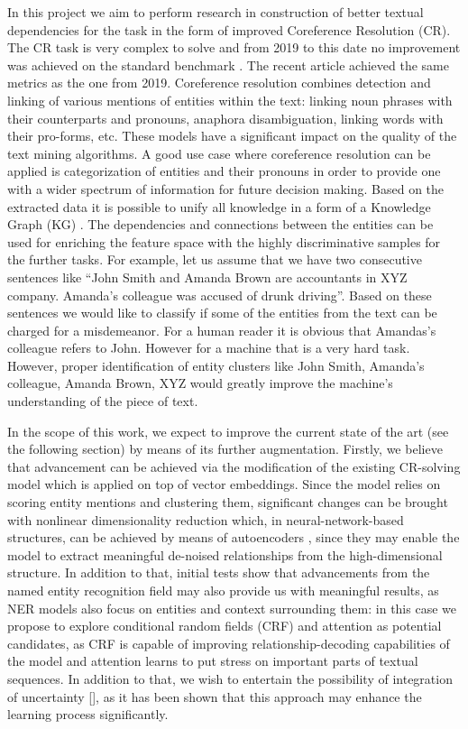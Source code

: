 In this project we aim to perform research in construction of better textual dependencies for the task in the form of improved Coreference Resolution (CR). The CR task is very complex to solve and from 2019 to this date \cite{spanbert-Joshi2020} no improvement was achieved on the standard benchmark \cite{ontonotes5-Weischedel2013}. The recent article \cite{cr-Toshniwal2020} achieved the same metrics as the one from 2019. Coreference resolution combines detection and linking of various mentions of entities within the text: linking noun phrases with their counterparts and pronouns, anaphora disambiguation, linking words with their pro-forms, etc.  These models have a significant impact on the quality of the text mining algorithms. A good use case where  coreference resolution can be applied is categorization of entities and their pronouns in order to provide one with a wider spectrum of information for future decision making. Based on the extracted data it is possible to unify all knowledge in a form of a Knowledge Graph (KG) \cite{kg-Wang2017}. The dependencies and connections between the entities can be used for enriching the feature space with the highly discriminative samples for the further tasks. 
For example, let us assume that we have two consecutive sentences like “John Smith and Amanda Brown are accountants in XYZ company. Amanda’s colleague was accused of drunk driving”. Based on these sentences we would like to classify if some of the entities from the text can be charged for a misdemeanor. For a human reader it is obvious that Amandas’s colleague refers to John. However for a machine that is a very hard task. However, proper identification of entity clusters like {John Smith, Amanda’s colleague}, {Amanda Brown}, {XYZ} would greatly improve the machine’s understanding of the piece of text.

In the scope of this work, we expect to improve the current state of the art (see the following section) by means of its further augmentation. Firstly, we believe that advancement can be achieved via the modification of the existing CR-solving model which is applied on top of vector embeddings. Since the model relies on scoring entity mentions and clustering them, significant changes can be brought with nonlinear dimensionality reduction which, in neural-network-based structures, can be achieved by means of autoencoders \cite{autoencoders-Zabalza2016,autoencoders-Sahay2019}, since they may enable the model to extract meaningful de-noised relationships from the high-dimensional structure. In addition to that, initial tests show that advancements from the named entity recognition field may also provide us with meaningful results, as NER models also focus on entities and context surrounding them: in this case we propose to explore conditional random fields (CRF) \cite{ner-Strakova2019,ner-Zhanming2019,ner-Zhanming2019} and attention \cite{ner-Yamada2020} as potential candidates, as CRF is capable of improving relationship-decoding capabilities of the model and attention learns to put stress on important parts of textual sequences. In addition to that, we wish to entertain the possibility of integration of uncertainty {\color{red}[]}, as it has been shown that this approach may enhance the learning process significantly.

